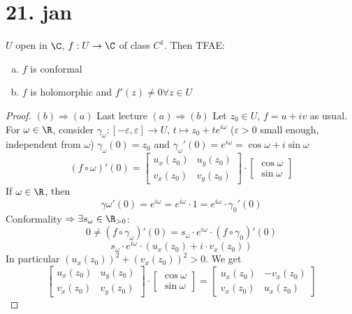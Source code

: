 \section*{21. jan}
\begin{proposition}
    $U$ open in $\C$, $f:U\to \C$ of class $C^1$. Then TFAE:
      \begin{enumerate}[(a)]
        \item $f$ is conformal
        \item $f$ is holomorphic and $f'(z)\neq 0 \forall z\in U$
      \end{enumerate}
\end{proposition}

\begin{proof}
$(b)\Rightarrow (a)$ Last lecture
\newline
$(a)\Rightarrow (b)$ Let $z_0\in U$, $f=u+iv$ as usual.
\newline
For $\omega \in \R$, consider $\gamma_\omega:[-\varepsilon , \varepsilon]\to U$, $t\mapsto z_0+te^{i\omega}$ ($\varepsilon>0$ small enough, independent from $\omega$)
\newline
$\gamma_\omega(0)=z_0$ and $\gamma_\omega'(0)=e^{i\omega}=\cos \omega +i \sin \omega $
$$\left(f\circ \omega\right)'(0)=
\begin{bmatrix}
  u_x(z_0) & u_y(z_0) \\
  v_x(z_0) & v_y(z_0)
\end{bmatrix}
\cdot
\begin{bmatrix}
    \cos \omega \\
    \sin \omega
\end{bmatrix}
$$
If $\omega \in \R$, then
  $$\gamma\omega'(0)=e^{i\omega}=e^{i\omega}\cdot 1=e^{i\omega}\cdot \gamma_0'(0)$$
Conformality $\Rightarrow  \exists s_\omega\in \R_{>0}$:
  $$0\neq (f\circ \gamma_\omega)'(0)=s_\omega\cdot e^{i\omega} \cdot  \left(f\circ \gamma_0\right)'(0)$$
  $$s_\omega\cdot e^{i\omega} \cdot \left(u_x(z_0)+i\cdot v_x(z_0)\right)$$
In particular $(u_x(z_0))^2+(v_x(z_0))^2>0$. We get
$$
\begin{bmatrix}
  u_x(z_0) & u_y(z_0) \\
  v_x(z_0) & v_y(z_0)
\end{bmatrix}
\cdot
\begin{bmatrix}
  \cos \omega \\
  \sin \omega
\end{bmatrix}
=
\begin{bmatrix}
  u_x(z_0) & -v_x(z_0) \\
  v_x(z_0) & u_x(z_0)

\end{bmatrix}$$
\end{proof}
